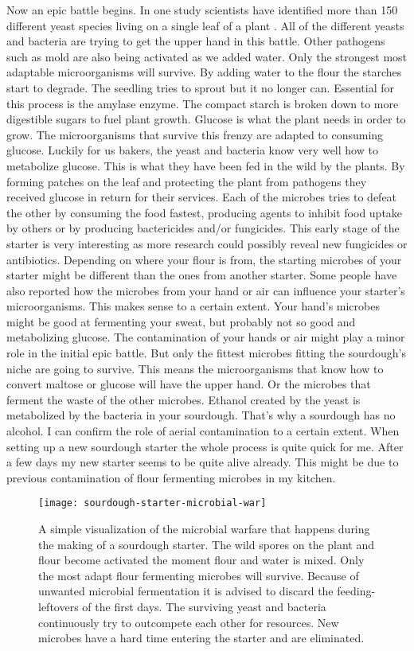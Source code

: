 Now an epic battle begins. In one study scientists
have identified more than 150 different yeast species living
on a single leaf of a plant \cite{yeasts+biocontrol+agent}.
All of the different yeasts and bacteria are trying to get
the upper hand in this battle. Other pathogens such as mold
are also being activated as we added water. Only the strongest
most adaptable microorganisms will survive. By adding water to the
flour the starches start to degrade. The seedling tries to
sprout but it no longer can. Essential for this process is the
amylase enzyme. The compact starch is broken down to more
digestible sugars to fuel plant growth. Glucose is what the
plant needs in order to grow. The microorganisms that survive
this frenzy are adapted to consuming glucose. Luckily for us
bakers, the yeast and bacteria know very well how to metabolize
glucose. This is what they have been fed in the wild by the plants.
By forming patches on the leaf and protecting the plant from
pathogens they received glucose in return for their services.
Each of the microbes tries to defeat the other by consuming the
food fastest, producing agents to inhibit food uptake by others or by producing
bactericides and/or fungicides. This early stage of the starter
is very interesting as more research could possibly reveal
new fungicides or antibiotics. Depending on where your flour
is from, the starting microbes of your starter might be different
than the ones from another starter. Some people have also reported
how the microbes from your hand or air can influence your starter's
microorganisms. This makes sense to a certain extent. Your
hand's microbes might be good at fermenting your sweat, but
probably not so good and metabolizing glucose. The contamination
of your hands or air might play a minor role in the initial epic
battle. But only the fittest microbes fitting the sourdough's
niche are going to survive. This means the microorganisms that know
how to convert maltose or glucose will have the upper hand. Or the
microbes that ferment the waste of the other microbes. Ethanol created
by the yeast is metabolized by the bacteria in your sourdough. That's
why a sourdough has no alcohol. I can confirm the role of aerial
contamination to a certain extent. When setting up a new sourdough
starter the whole process is quite quick for me. After a few
days my new starter seems to be quite alive already. This might
be due to previous contamination of flour fermenting microbes in
my kitchen.

\begin{figure}[!htb]
  \texttt{[image: sourdough-starter-microbial-war]}
  \caption{A simple visualization of the microbial warfare that happens during the making of a sourdough starter. The
  wild spores on the plant and flour become activated the moment flour and water is mixed.
  Only the most adapt flour fermenting microbes will survive. Because of unwanted microbial fermentation it is advised
  to discard the feeding-leftovers of the first days. The surviving yeast and bacteria continuously try to
  outcompete each other for resources. New microbes have a hard time entering the starter and are eliminated.
  }
  \label{fig:sourdough-starter-microbial-war}
\end{figure}

